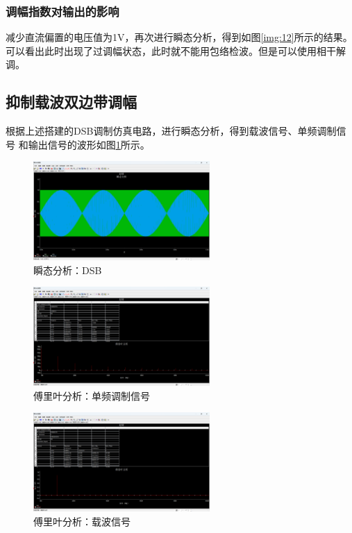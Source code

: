 \documentclass[UTF8]{ctexart}
\begin{document}
\subsubsection{调幅指数对输出的影响}
减少直流偏置的电压值为1V，再次进行瞬态分析，得到如图\ref{img:12}所示的结果。
可以看出此时出现了过调幅状态，此时就不能用包络检波。但是可以使用相干解调。
\subsection{抑制载波双边带调幅}
根据上述搭建的DSB调制仿真电路，进行瞬态分析，得到载波信号、单频调制信号
和输出信号的波形如图\ref{img:13}所示。
\begin{figure}[htbp]
    \centering
    \includegraphics[width=0.6\textwidth]{13.png}
    \caption{瞬态分析：DSB}
    \label{img:13}
\end{figure}
\begin{figure}[htbp]
    \centering
    \includegraphics[width=0.6\textwidth]{14.png}
    \caption{傅里叶分析：单频调制信号}
    \label{img:14}
\end{figure}
\begin{figure}[htbp]
    \centering
    \includegraphics[width=0.6\textwidth]{15.png}
    \caption{傅里叶分析：载波信号}
    \label{img:15}
\end{figure}
\end{document}
